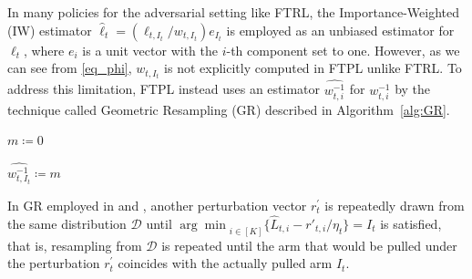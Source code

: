 In many policies for the adversarial setting like FTRL,
the Importance-Weighted (IW) estimator $\hat{\ell}_t=\left( \ell_{t, I_t} / w_{t, I_t}
\right) e_{I_t}$
is employed
as an unbiased estimator for $\ell_t$,
where $e_i$ is a unit vector with the $i$-th component set to one.
However,
as we can see from \eqref{eq_phi},
$w_{t,I_t}$ is not explicitly computed in FTPL unlike FTRL.
To address this limitation, FTPL instead uses an estimator $\widehat{w_{t,i}^{-1}}$ 
 for $w_{t,i}^{-1}$ by the technique called Geometric Resampling (GR) described in Algorithm~\ref{alg:GR}.
\setlength{\textfloatsep}{1.3em}
\begin{algorithm}[t]
\caption{Geometric Resampling}
\label{alg:GR}

$m \coloneqq 0$\;


$\widehat{w_{t,I_t}^{-1}} \coloneqq m$\;
\end{algorithm}


In GR
employed in \citet{JMLR:v17:15-091} and \citet{pmlr-v201-honda23a},
another perturbation vector $r_t^{\prime}$ is repeatedly drawn from the same
distribution $\mathcal{D}$ until
${\arg\min}_{i \in [K]} \{\hat{L}_{t,i} - r'_{t,i}/\eta_t\} = I_t$ is 
satisfied, that is, resampling from $\mathcal{D}$ is repeated until the
arm that would be pulled under the perturbation $r_t^{\prime}$
coincides with the actually pulled arm $I_t$.


